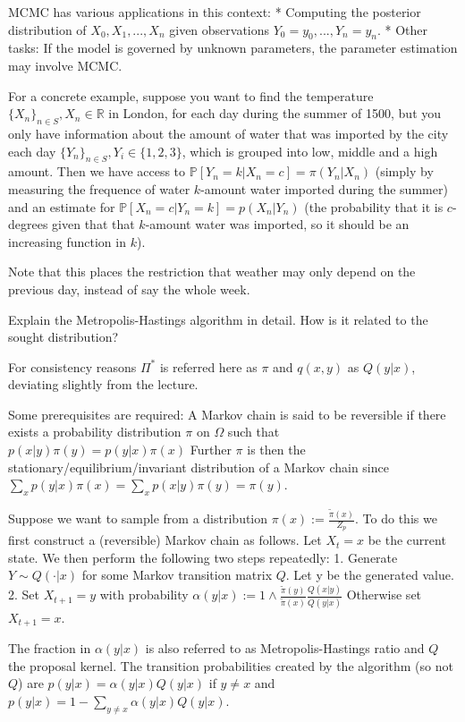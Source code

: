 MCMC has various applications in this context:
* Computing the posterior distribution of \(X_0, X_1, ..., X_n\) given observations \(Y_0 = y_0, ..., Y_n = y_n\).
* Other tasks: If the model is governed by unknown parameters, the parameter estimation may involve MCMC. 

For a concrete example, suppose you want to find the temperature \( \{X_n\}_{n \in S}, X_n \in \mathbb{R}\) in London, for each day during the summer of 1500,
but you only have information about the amount of water that was imported by the city each day \( \{Y_n\}_{n \in S}, Y_i \in \{1, 2, 3\} \), 
which is grouped into low, middle and a high amount. Then we have access to \( \mathbb{P}[Y_n = k|X_n = c] = \pi(Y_n|X_n)\) 
(simply by measuring the frequence of water \( k \)-amount water imported during the summer)
and an estimate for \( \mathbb{P}[X_n = c|Y_n = k] = p(X_n|Y_n) \) (the probability that it is \( c \)-degrees given that that \( k \)-amount water
was imported, so it should be an increasing function in \( k \)). 

Note that this places the restriction that weather may only depend on the previous day, instead of say the whole week.


Explain the Metropolis-Hastings algorithm in detail. How is it related to the sought
distribution?

For consistency reasons \( \Pi^{*} \) is referred here as \( \pi \) and \( q(x,y) \) as \( Q(y|x) \),
deviating slightly from the lecture.

Some prerequisites are required:
A Markov chain is said to be reversible if there exists a probability distribution \( \pi \) on \( \Omega \) such
that \( p(x | y)\pi(y) = p(y | x)\pi(x) \)
Further \( \pi \) is then the stationary/equilibrium/invariant distribution of a Markov chain
since
\( \sum_{x} p(y|x) \pi(x) = \sum_x p(x|y)\pi(y) = \pi(y) \).

Suppose we want to sample from a distribution \( \pi(x) := \frac{\tilde{\pi}(x)}{Z_p} \). To do this
we first construct a (reversible) Markov chain as follows. Let \( X_t = x \) be the current state. We then perform the
following two steps repeatedly:
1. Generate \( Y \sim Q(\cdot | x) \) for some Markov transition matrix \( Q \).
Let y be the generated value.
2. Set \( X_{t+1} = y \) with probability \( α(y | x) := 1 \wedge \frac{\tilde{\pi}(y)}{\tilde{\pi}(x)} \frac{Q(x|y)}{Q(y|x)} \)
Otherwise set \( X_{t+1} = x \).

The fraction in \( \alpha(y|x) \) is also referred to as Metropolis-Hastings ratio
and \( Q \) the proposal kernel.
The transition probabilities created by the algorithm (so not \( Q \)) are
\( p(y|x) = \alpha(y|x)Q(y|x) \) if \( y \neq x \) and \( p(y|x) = 1 - \sum_{y \neq x} \alpha(y|x)Q(y|x) \).


